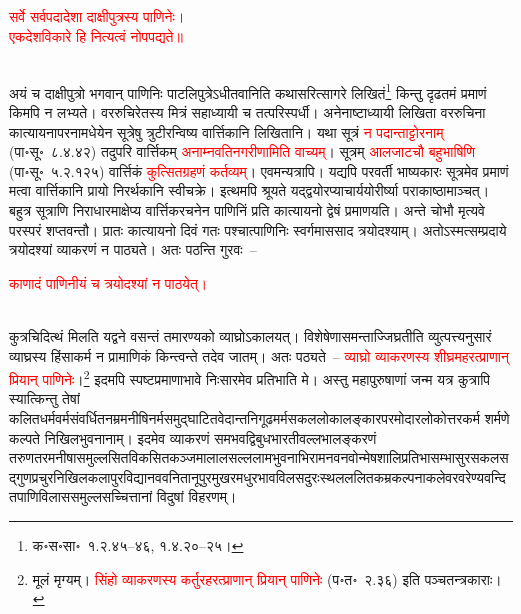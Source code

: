 \centering\textcolor{red}{सर्वे सर्वपदादेशा दाक्षीपुत्रस्य पाणिनेः। \nopagebreak\\
एकदेशविकारे हि नित्यत्वं नोपपद्यते॥}\nopagebreak\\
\\
\begin{sloppypar}\justifying\noindent अयं च दाक्षी\-पुत्रो भगवान् पाणिनिः पाटलिपुत्रेऽधीतवानिति कथा\-सरित्सागरे लिखितं\footnote{क॰स॰सा॰~१.२.४५–४६, १.४.२०–२५।} किन्तु दृढतमं प्रमाणं किमपि न लभ्यते। वररुचिरेतस्य मित्रं सहाध्यायी च तत्परिस्पर्धी। अनेनाष्टाध्यायी लिखिता वररुचिना कात्यायनापर\-नामधेयेन सूत्रेषु त्रुटीरन्विष्य वार्त्तिकानि लिखितानि। यथा सूत्रं \textcolor{red}{न पदान्ताट्टोरनाम्} (पा॰सू॰~८.४.४२) तदुपरि वार्त्तिकम् \textcolor{red}{अनाम्नवति\-नगरीणामिति वाच्यम्}। सूत्रम् \textcolor{red}{आलजाटचौ बहुभाषिणि} (पा॰सू॰~५.२.१२५) वार्त्तिकं \textcolor{red}{कुत्सित\-ग्रहणं कर्तव्यम्}। एवमन्यत्रापि। यद्यपि पर\-वर्ती भाष्यकारः सूत्रमेव प्रमाणं मत्वा वार्त्तिकानि प्रायो निरर्थकानि स्वीचक्रे। इत्थमपि श्रूयते यद्द्वयोरप्याचार्ययोरीर्ष्या पराकाष्ठामाञ्चत्। बहुत्र सूत्राणि निराधारमाक्षेप्य वार्त्तिक\-रचनेन पाणिनिं प्रति कात्यायनो द्वेषं प्रमाणयति। अन्ते चोभौ मृत्यवे परस्परं शप्तवन्तौ। प्रातः कात्यायनो दिवं गतः पश्चात्पाणिनिः स्वर्गमाससाद त्रयोदश्याम्। अतोऽस्मत्सम्प्रदाये त्रयोदश्यां व्याकरणं न पाठ्यते। अतः पठन्ति गुरवः~–\end{sloppypar}
\centering\textcolor{red}{काणादं पाणिनीयं च त्रयोदश्यां न पाठयेत्।}\nopagebreak\\
\\
\begin{sloppypar}\justifying\noindent कुत्रचिदित्थं मिलति यद्वने वसन्तं तमारण्यको व्याघ्रोऽकालयत्। विशेषेणासमन्ताज्जिघ्रतीति व्युत्पत्त्यनुसारं व्याघ्रस्य हिंसा\-कर्म न प्रामाणिकं किन्त्वन्ते तदेव जातम्। अतः पठ्यते~– \textcolor{red}{व्याघ्रो व्याकरणस्य शीघ्रमहरत्प्राणान् प्रियान् पाणिनेः}।\footnote{मूलं मृग्यम्। \textcolor{red}{सिंहो व्याकरणस्य कर्तुरहरत्प्राणान् प्रियान् पाणिनेः} (प॰त॰~२.३६) इति पञ्चतन्त्रकाराः।} इदमपि स्पष्ट\-प्रमाणाभावे निःसारमेव प्रतिभाति मे। अस्तु महा\-पुरुषाणां जन्म यत्र कुत्रापि स्यात्किन्तु तेषां कलित\-धर्म\-वर्म\-संवर्धित\-नम्र\-मनीषि\-नर्म\-समुद्घाटित\-वेदान्त\-निगूढ\-मर्म\-सकल\-लोकालङ्कार\-परमोदार\-लोकोत्तर\-कर्म शर्मणे कल्पते निखिल\-भुवनानाम्। इदमेव व्याकरणं समभवद्विबुध\-भारती\-वल्लभालङ्करणं तरुणतर\-मनीषा\-समुल्लसित\-विकसित\-कञ्ज\-माला\-लसल्ललाम\-भुवनाभिराम\-नव\-नवोन्मेष\-शालि\-प्रतिभा\-सम्भासुर\-सकल\-सद्गुण\-प्रचुर\-निखिल\-कला\-पुर\-विद्या\-नव\-वनिता\-नूपुर\-मुखर\-मधुर\-भाव\-विलसदुरःस्थल\-ललित\-कम्र\-कल्पना\-कलेवर\-वरेण्य\-वन्दित\-पाणि\-विलास\-समुल्लसच्चित्तानां विदुषां विहरणम्।\end{sloppypar}
